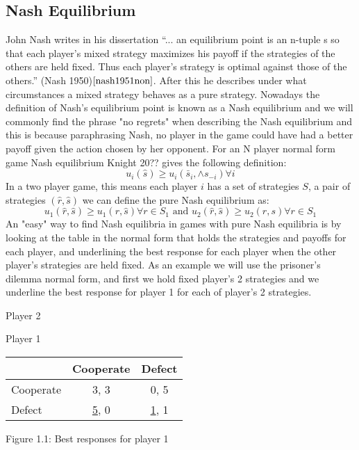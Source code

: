 \documentclass{article}
\begin{document}
\subsection{Nash Equilibrium}\label{third_section}
John Nash writes in his dissertation ``... an equilibrium point is an n-tuple s so that each player's mixed strategy maximizes his payoff if the strategies of the others are held fixed. Thus each player's strategy is optimal against those of the others.'' (Nash 1950)$\cite{nash1951non}$.  After this he describes under what circumstances a mixed strategy behaves as a pure strategy. Nowadays the definition of Nash's equilibrium point is known as a Nash equilibrium and we will commonly find the phrase "no regrets" when describing the Nash equilibrium and this is because paraphrasing Nash, no player in the game could have had a better payoff given the action chosen by her opponent. For an N player normal form game Nash equilibrium Knight 20?? gives the following definition:
\begin{equation}
u_i(\hat{s}) \geq u_i(\bar{s}_i, \wedge{s}_{-i}) \forall i
\end{equation}
 In a two player game, this means each player $\textit{i}$ has a set of strategies $\textit{S}$,  a pair of strategies $(\hat{r}, \hat{s})$ we can define the pure Nash equilibrium as:
\begin{equation}
u_1(\hat{r}, \hat{s}) \geq u_1(r, \hat{s}) \forall r \in S_1   \text{ and }  u_2(\hat{r}, \hat{s}) \geq u_2(\hat{r}, s) \forall r \in S_1
\end{equation}
An "easy" way to find Nash equilibria in games with pure Nash equilibria is by looking at the table in the normal form that holds the strategies and payoffs for each player, and underlining the best response for each player when the other player's strategies are held fixed.
As an example we will use the prisoner's dilemma normal form, and first we hold fixed player's 2 strategies and we underline the best response for player 1 for each of player's 2 strategies.

\begin{center}
Player 2

Player 1
\begin{tabular}{|l|c|c|}
\hline
 & Cooperate & Defect\\ 
\hline
Cooperate & 3, 3 & 0, 5\\
\hline
Defect & \underline{5}, 0 & \underline{1}, 1\\
\hline
\end{tabular}

Figure 1.1: Best responses for player 1
\end{center}
\end{document}
